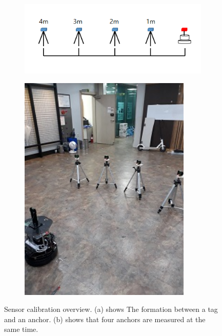 \documentclass[letterpaper, 10 pt, conference]{ieeeconf}  %
\begin{document}
\begin{figure}[h]
	\centering
	\begin{subfigure}[b]{.35\textwidth}
		\centering
		\includegraphics[width=.9\textwidth]{calib}
		\label{calibration:sub1} 	
		\caption{}
	\end{subfigure}%
	\begin{subfigure}[b]{.15\textwidth}
		\centering
		\includegraphics[width=0.9\textwidth]{calib2}
		\label{calibration:sub2} 	
		\caption{}
	\end{subfigure}
	\caption{Sensor calibration overview. (a) shows The formation between a tag and an anchor. (b) shows that four anchors are measured at the same time.}
	\label{calibration}
\end{figure} 
\end{document}
